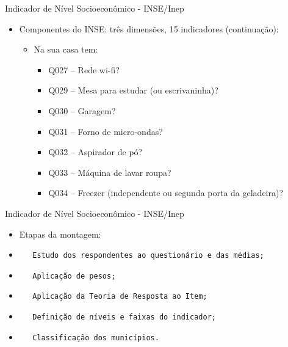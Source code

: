 \documentclass[
  ignorenonframetext,
]{beamer}
\providecommand{\tightlist}{%
  \setlength{\itemsep}{0pt}\setlength{\parskip}{0pt}}
\begin{document}
\begin{frame}
Indicador de Nível Socioeconômico - INSE/Inep

\begin{itemize}
\tightlist
\item
  Componentes do INSE: três dimensões, 15 indicadores (continuação):

  \begin{itemize}
  \tightlist
  \item
    Na sua casa tem:

    \begin{itemize}
    \tightlist
    \item
      Q027 -- Rede wi-fi?
    \item
      Q029 -- Mesa para estudar (ou escrivaninha)?
    \item
      Q030 -- Garagem?
    \item
      Q031 -- Forno de micro-ondas?
    \item
      Q032 -- Aspirador de pó?
    \item
      Q033 -- Máquina de lavar roupa?
    \item
      Q034 -- Freezer (independente ou segunda porta da geladeira)?
    \end{itemize}
  \end{itemize}
\end{itemize}
\end{frame}

\begin{frame}[fragile]
Indicador de Nível Socioeconômico - INSE/Inep

\begin{itemize}[<+->]
\item
  Etapas da montagem:
\item
\begin{verbatim}
   Estudo dos respondentes ao questionário e das médias;
\end{verbatim}
\item
\begin{verbatim}
   Aplicação de pesos;
\end{verbatim}
\item
\begin{verbatim}
   Aplicação da Teoria de Resposta ao Item;
\end{verbatim}
\item
\begin{verbatim}
   Definição de níveis e faixas do indicador;
\end{verbatim}
\item
\begin{verbatim}
   Classificação dos municípios.
\end{verbatim}
\end{itemize}
\end{frame}
\end{document}
